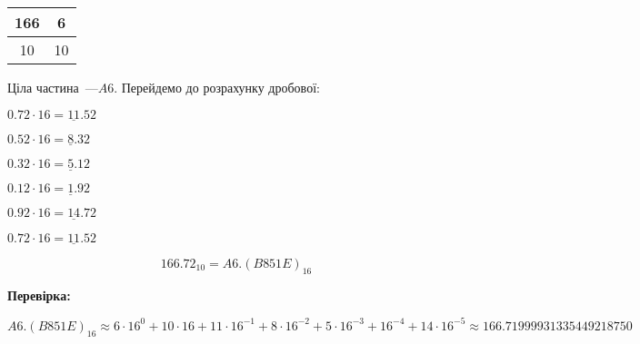 \documentclass[14pt]{extreport}
\begin{document}
\begin{multicols}{2}
	\begin{tabular}{c|c}
		166 & 6 \\
		\hline
		10 & 10 \\
	\end{tabular}

	\bigskip
	Ціла частина~---$A6.$ Перейдемо
	до розрахунку дробової:

	\bigskip

$0.72\cdot16=\underline{11}.52$

$0.52\cdot16=\underline{8}.32$

$0.32\cdot16=\underline{5}.12$

$0.12\cdot16=\underline{1}.92$

$0.92\cdot16=\underline{14}.72$

$0.72\cdot16=\underline{11}.52$

\end{multicols}
$$166.72_{10}=A6.(B851E)_{16}$$

\bigskip
\textbf{Перевірка:}

$A6.(B851E)_{16}\approx6 \cdot 16^0+10 \cdot 16+11 \cdot 16^{-1}+8 \cdot 16^{-2}+5 \cdot 16^{-3}+16^{-4}+14 \cdot 16^{-5}
\approx 166.71999931335449218750$
\end{document}
